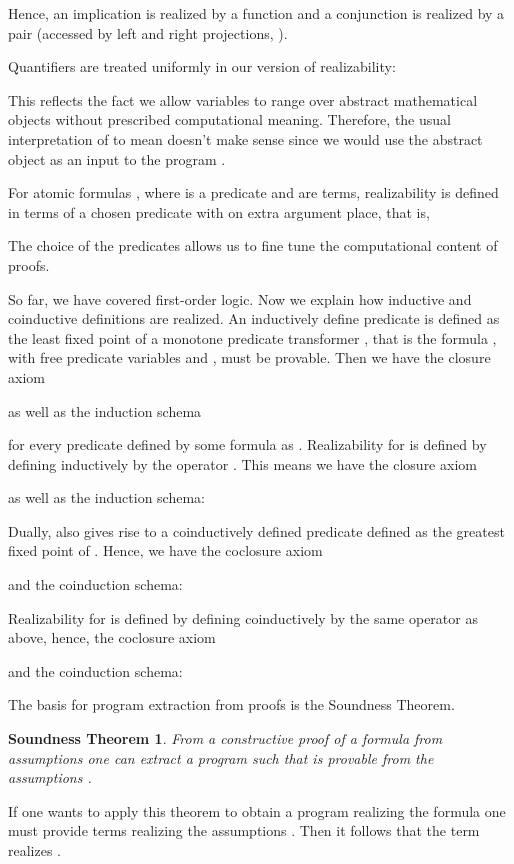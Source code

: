 \documentclass[microtype]{jloganal}
\theoremstyle{plain}
\newtheorem*{sdthm}{Soundness Theorem}
\theoremstyle{definition}
\begin{document}
Hence, an implication is realized by a function and a conjunction is realized
by a pair (accessed by left and right projections, ).

Quantifiers are treated uniformly in our version of realizability:

This reflects the fact we allow variables  to range over abstract 
mathematical objects without prescribed computational meaning. Therefore, the
usual interpretation of  to mean
 doesn't make sense since we would use
the abstract object  as an input to the program .

For atomic formulas , where  is a predicate and  are 
terms, realizability is defined in terms of a chosen predicate  
with on extra argument place, that is,

The choice of the predicates  allows us to fine tune the computational
content of proofs.

So far, we have covered first-order logic. Now we explain how inductive and 
coinductive definitions are realized. 
An inductively define predicate  is defined as the least fixed point of
a monotone predicate transformer , that is the formula
,
with free predicate variables  and , must be provable.
Then we have the closure axiom

as well as the induction schema

for every predicate  defined by some formula  
as .
Realizability for  is defined by defining  inductively by 
the operator 
.
This means we have the closure axiom 

as well as the induction schema:

Dually,  also gives rise to a coinductively defined predicate  
defined as the greatest fixed point of . Hence, we have the coclosure axiom

and the coinduction schema:

Realizability for  is defined by
defining  coinductively by the same operator  as above,
hence, the coclosure axiom 

and the coinduction schema:

The basis for program extraction from proofs is the Soundness Theorem.
\begin{sdthm}
 From a constructive proof of a formula 
from assumptions  one can extract a program 
 such that  is provable
from the assumptions .
\end{sdthm}
 
If one wants to apply this theorem to obtain a program realizing the
formula  one must provide terms  realizing the assumptions
. Then it follows that the term  realizes
.
\end{document}
